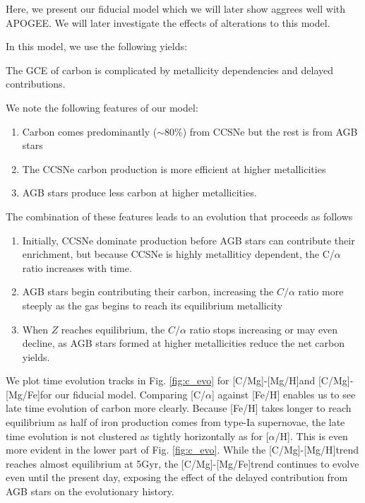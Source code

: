 \documentclass[12pt,oneside]{report}
\newcommand{\caah}{[C/Mg]-[Mg/H]}
\newcommand{\caafe}{[C/Mg]-[Mg/Fe]}
\begin{document}
Here, we present our fiducial model which we will later show aggrees well with APOGEE. We will later investigate the effects of alterations to this model. 

In this model, we use the following yields:

The GCE of carbon is complicated by metallicity dependencies and delayed contributions. 

We note the following features of our model:

\begin{enumerate}
    \item Carbon comes predominantly ($\sim80\%$) from CCSNe but the rest is from AGB stars
    \item The CCSNe carbon production is more efficient at higher metallicities
    \item AGB stars produce less carbon at higher metallicities.
\end{enumerate}


The combination of these features leads to an evolution that proceeds as follows
\begin{enumerate}
    \item Initially, CCSNe dominate production before AGB stars can contribute their enrichment, but because CCSNe is highly metalliticy dependent, the C/$\alpha$ ratio increases with time.
    \item AGB stars begin contributing their carbon, increasing the $C/\alpha$ ratio more steeply as the gas begins to reach its equilibrium metallicity
    \item When $Z$ reaches equilibrium, the $C/\alpha$ ratio stops increasing or may even decline, as AGB stars formed at higher metallicities reduce the net carbon yields.
\end{enumerate}

We plot time evolution tracks in Fig. \ref{fig:c_evo} for \caah and \caafe for our fiducial model. Comparing [C/$\alpha$] against [Fe/H] enables us to see late time evolution of carbon more clearly. Because [Fe/H] takes longer to reach equilibrium as half of iron production comes from type-Ia supernovae, the late time evolution is not clustered as tightly horizontally as for [$\alpha$/H].
This is even more evident in the lower part of Fig. \ref{fig:c_evo}. While the \caah trend reaches almost equilibrium at 5Gyr, the \caafe trend continues to evolve even until the present day, exposing the effect of the delayed contribution from AGB stars on the evolutionary history.
\end{document}
